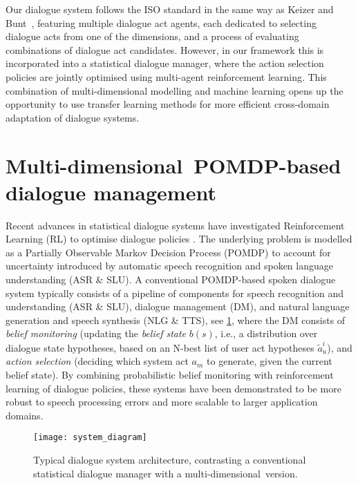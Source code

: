 \documentclass[11pt]{article}
\def\mdim{multi\hyp dimensional}
\def\Mdim{Multi\hyp dimensional}
\begin{document}
Our dialogue system follows the ISO standard in the same way as Keizer and Bunt~, featuring multiple dialogue act agents, each dedicated to selecting dialogue acts from one of the dimensions, and a process of evaluating combinations of dialogue act candidates.  However, in our framework this is incorporated into a statistical dialogue manager, where the action selection policies are jointly optimised using multi-agent reinforcement learning.  This combination of multi-dimensional modelling and machine learning opens up the opportunity to use transfer learning methods for more efficient cross-domain adaptation of dialogue systems.


\section{\Mdim\ POMDP-based dialogue management}\label{sec:md-pomdp-dial}

Recent advances in statistical dialogue systems have investigated Reinforcement Learning (RL) to optimise dialogue policies \cite{rl:springer11,young-etal-ieee-review}.  The underlying problem is modelled as a Partially Observable Markov Decision Process (POMDP) to account for uncertainty introduced by automatic speech recognition and spoken language understanding (ASR \& SLU).  A conventional POMDP-based spoken dialogue system typically consists of a pipeline of components for speech recognition and understanding (ASR \& SLU), dialogue management (DM), and natural language generation and speech synthesis (NLG \& TTS), see \cref{fig:sys_diag}, where the DM consists of \emph{belief monitoring} (updating the \emph{belief state} $b(s)$, i.e., a distribution over dialogue state hypotheses, based on an N-best list of user act hypotheses $\tilde{a}_u^i$), and \emph{action selection} (deciding which system act $a_m$ to generate, given the current belief state).  By combining probabilistic belief monitoring with reinforcement learning of dialogue policies, these systems have been demonstrated to be more robust to speech processing errors and more scalable to larger application domains. 
\begin{figure}[htb]
\centering
\texttt{[image: system\_diagram]}
\caption{Typical dialogue system architecture, contrasting a conventional statistical dialogue manager with a \mdim\ version.}
\label{fig:sys_diag}
\end{figure}
\end{document}
